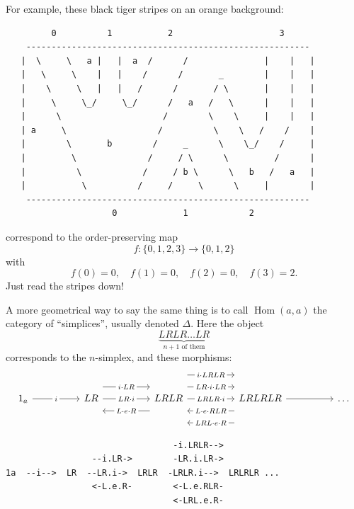 \documentclass{article}
\begin{document}
For example, these black tiger stripes on an orange background:

\begin{verbatim}
         0          1           2                     3
    --------------------------------------------------------
   |  \     \   a |   |  a  /      /               |    |   |
   |   \     \    |   |    /      /       _        |    |   |
   |    \     \   |   |   /      /       / \       |    |   |
   |     \     \_/     \_/      /   a   /   \      |    |   |
   |      \                    /        \    \     |    |   |
   | a     \                  /          \    \   /    /    |
   |        \       b        /     _      \    \_/    /     |
   |         \              /     / \      \         /      |
   |          \            /     / b \      \   b   /   a   |
   |           \          /     /     \      \     |        |
    --------------------------------------------------------
                     0             1            2
\end{verbatim}

correspond to the order-preserving map
\[f\colon \{0,1,2,3\} \to \{0,1,2\}\] with
\[f(0) = 0,\quad f(1) = 0,\quad f(2) = 0,\quad f(3) = 2.\] Just read the
stripes down!

A more geometrical way to say the same thing is to call
\(\operatorname{Hom}(a,a)\) the category of ``simplices'', usually
denoted \(\Delta\). Here the object
\[\underbrace{LRLR\ldots LR}_{\mbox{$n+1$ of them}}\] corresponds to the
\(n\)-simplex, and these morphisms: \[
  \begin{tikzcd}[column sep=huge]
    1_a
      \rar["i" description]
    & LR
      \rar[shift left=5,"i\cdot LR" description]
      \rar["LR\cdot i" description]
    & LRLR
      \rar[shift left=10,"i\cdot LRLR" description]
      \rar[shift left=5,"LR\cdot i\cdot LR" description]
      \rar["LRLR\cdot i" description]
      \lar[shift left=5,"L\cdot e\cdot R" description]
    & LRLRLR
      \lar[shift left=5,"L\cdot e\cdot RLR" description]
      \lar[shift left=10,"LRL\cdot e\cdot R" description]
      \rar
    &\ldots
  \end{tikzcd}
\]

\begin{verbatim}
                                 -i.LRLR-->
                 --i.LR->        -LR.i.LR->
1a  --i-->  LR  --LR.i->  LRLR  -LRLR.i-->  LRLRLR ...
                 <-L.e.R-        <-L.e.RLR-
                                 <-LRL.e.R-
\end{verbatim}
\end{document}
